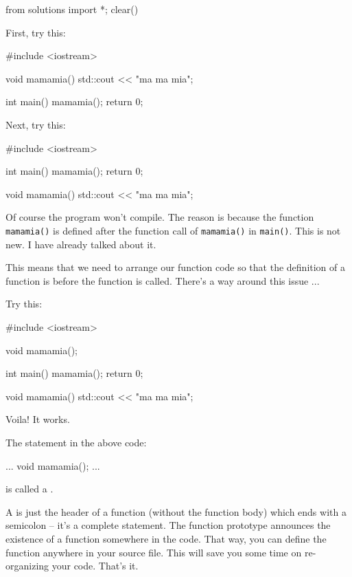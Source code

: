 \begin{python0}
from solutions import *; clear()
\end{python0}

First, try this:

\begin{consolethree}[escapeinside=||]
#include <iostream>

void mamamia()
{
    std::cout << "ma ma mia\n";
}

int main()
{
    mamamia();
    return 0;
}
\end{consolethree}

Next, try this:

\begin{consolethree}[escapeinside=||]
#include <iostream>

int main()
{
    mamamia();
    return 0;
}

void mamamia()
{
    std::cout << "ma ma mia\n";
}
\end{consolethree}

Of course the program won't compile. The reason is because the function \texttt{mamamia()} is defined after the function call of \texttt{mamamia()} in \texttt{main()}. This is not new. I have already talked about it.

This means that we need to arrange our function code so that the definition of a function is before the function is called. There's a way around this issue ...

Try this:

\begin{consolethree}[escapeinside=||]
#include <iostream>

void mamamia();

int main()
{
    mamamia();
    return 0;
}

void mamamia()
{
    std::cout << "ma ma mia\n";
}
\end{consolethree}

Voila! It works.

The statement in the above code:

\begin{consolethree}[escapeinside=||]
...
void mamamia();
...
\end{consolethree}

is called a .

A  is just the header of a function (without the function body) which ends with a semicolon -- it's a complete statement. The function prototype announces the existence of a function somewhere in the code. That way, you can define the function anywhere in your source file. This will save you some time on re-organizing your code. That's it.

